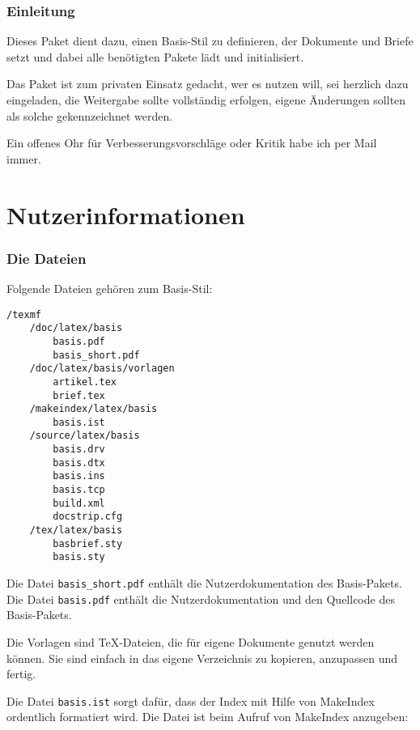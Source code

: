 
\section{Einleitung}

Dieses Paket dient dazu, einen Basis-Stil zu definieren, der Dokumente und Briefe
setzt und dabei alle benötigten Pakete lädt und initialisiert.

Das Paket ist zum privaten Einsatz gedacht, wer es nutzen will, sei herzlich dazu
eingeladen, die Weitergabe sollte vollständig erfolgen, eigene Änderungen sollten
als solche gekennzeichnet werden.

Ein offenes Ohr für Verbesserungsvorschläge oder Kritik habe ich per Mail immer.


\cleardoublepage
\part{Nutzerinformationen}
\cleardoublepage


\section{Die Dateien}
\label{sec:Dateien}

Folgende Dateien gehören zum Basis-Stil:
{\small
\begin{verbatim}
/texmf
	/doc/latex/basis
		basis.pdf
		basis_short.pdf
	/doc/latex/basis/vorlagen
		artikel.tex
		brief.tex
	/makeindex/latex/basis
		basis.ist
	/source/latex/basis
		basis.drv
		basis.dtx
		basis.ins
		basis.tcp
		build.xml
		docstrip.cfg
	/tex/latex/basis
		basbrief.sty
		basis.sty
\end{verbatim}
}


Die Datei \verb#basis_short.pdf# enthält die Nutzerdokumentation des Basis-Pakets.
Die Datei \verb#basis.pdf# enthält die Nutzerdokumentation und den Quellcode des Basis-Pakets.


Die Vorlagen sind \TeX-Dateien, die für eigene Dokumente genutzt werden können.
Sie sind einfach in das eigene Verzeichnis zu kopieren, anzupassen und fertig.


Die Datei \verb#basis.ist# sorgt dafür, dass der Index mit Hilfe von MakeIndex
ordentlich formatiert wird.
Die Datei ist beim Aufruf von MakeIndex anzugeben:

